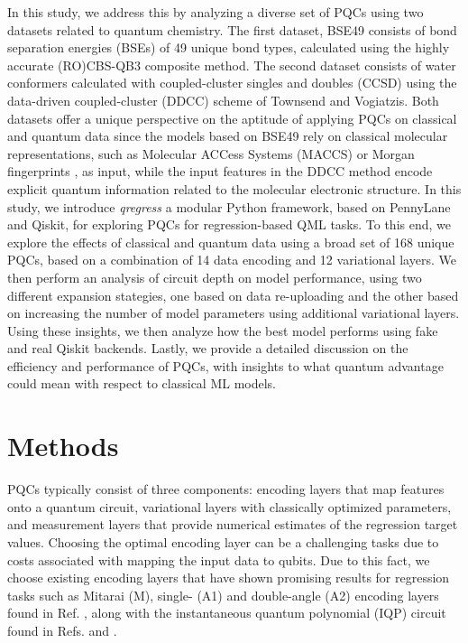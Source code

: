 \documentclass[journal=jacsat,manuscript=article]{achemso}
\begin{document}
In this study, we address this by analyzing a diverse set of PQCs using two datasets related to quantum chemistry.
The first dataset, BSE49 consists of bond separation energies (BSEs) of 49 unique bond types, calculated using the highly accurate (RO)CBS-QB3 composite method.\cite{prasad_bse49_2021}
The second dataset consists of water conformers calculated with coupled-cluster singles and doubles (CCSD) using the data-driven coupled-cluster (DDCC) scheme of Townsend and Vogiatzis.\cite{townsend_data-driven_2019,jones_chapter_2023}
Both datasets offer a unique perspective on the aptitude of applying PQCs on classical and quantum data\cite{cerezo_challenges_2022} since the models based on BSE49 rely on classical molecular representations\cite{jones_molecular_2023}, such as Molecular ACCess Systems (MACCS)\cite{durant_reoptimization_2002} or Morgan fingerprints \cite{morgan_generation_1965,rogers_extended-connectivity_2010}, as input, while the input features in the DDCC method encode explicit quantum information related to the molecular electronic structure.
In this study, we introduce \textit{qregress} a modular Python framework, based on PennyLane\cite{bergholm_pennylane_2022} and Qiskit\cite{javadi-abhari_quantum_2024}, for exploring PQCs for regression-based QML tasks.
To this end, we explore the effects of classical and quantum data using a broad set of 168 unique PQCs, based on a combination of 14 data encoding and 12 variational layers.
We then  perform an analysis of circuit depth on model performance, using two different expansion stategies, one based on data re-uploading\cite{perez-salinas_data_2020} and the other based on increasing the number of model parameters using additional variational layers.
Using these insights, we then analyze how the best model performs using fake and real Qiskit backends.
Lastly, we provide a detailed discussion on the efficiency and performance of PQCs, with insights to what quantum advantage could mean with respect to classical ML models.


\section{Methods}
PQCs typically consist of three components: encoding layers that map features onto a quantum circuit, variational layers with classically optimized parameters, and measurement layers that provide numerical estimates of the regression target values.\citep{suzuki_predicting_2020} 
Choosing the optimal encoding layer can be a challenging tasks due to costs associated with mapping the input data to qubits.\cite{biamonte_quantum_2017} 
Due to this fact, we choose existing encoding layers that have shown promising results for regression tasks such as Mitarai (M)\cite{mitarai_quantum_2018}, single- (A1) and double-angle (A2) encoding layers found in Ref. \citep{suzuki_predicting_2020}, along with the instantaneous quantum polynomial (IQP) circuit found in Refs. \citep{bremner_average-case_2016} and \citep{havlicek_supervised_2019}.
\end{document}
